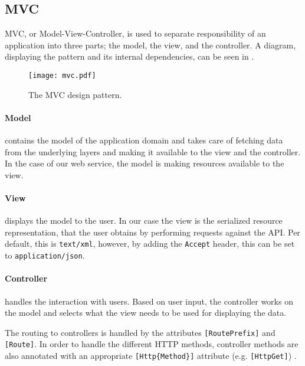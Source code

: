\subsection{MVC} 
MVC, or Model-View-Controller\cite{aspmvc}, is used to separate responsibility of an application into three parts; the model, the view, and the controller.
A diagram, displaying the pattern and its internal dependencies, can be seen in .

\begin{figure}[h]
\begin{center}
\texttt{[image: mvc.pdf]}
\caption{The MVC design pattern.}
\label{mvcdiagram}
\end{center}
\end{figure}

\paragraph{Model} contains the model of the application domain and takes care of fetching data from the underlying layers and making it available to the view and the controller.
In the case of our web service, the model is making resources available to the view.

\paragraph{View} displays the model to the user.
In our case the view is the serialized resource representation, that the user obtains by performing requests against the API.
Per default, this is \texttt{text/xml}, however, by adding the \texttt{Accept} header\cite[Section 14]{http_specification}, this can be set to \texttt{application/json}.

\paragraph{Controller} handles the interaction with users.
Based on user input, the controller works on the model and selects what the view needs to be used for displaying the data.

The routing to controllers is handled by the attributes \texttt{[RoutePrefix]} and \texttt{[Route]}.
In order to handle the different HTTP methods, controller methods are also annotated with an appropriate \texttt{[Http\{Method\}]} attribute (e.g. \texttt{[HttpGet]}) \cite{asp_routing}.
